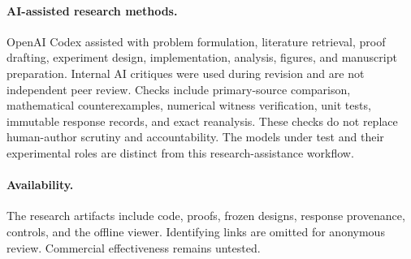 \documentclass[manuscript,review,anonymous]{acmart}
\begin{document}
\paragraph{AI-assisted research methods.}
OpenAI Codex assisted with problem formulation, literature retrieval, proof drafting, experiment design, implementation, analysis, figures, and manuscript preparation. Internal AI critiques were used during revision and are not independent peer review. Checks include primary-source comparison, mathematical counterexamples, numerical witness verification, unit tests, immutable response records, and exact reanalysis. These checks do not replace human-author scrutiny and accountability. The models under test and their experimental roles are distinct from this research-assistance workflow.

\paragraph{Availability.}
The research artifacts include code, proofs, frozen designs, response provenance, controls, and the offline viewer. Identifying links are omitted for anonymous review. Commercial effectiveness remains untested.



\end{document}
